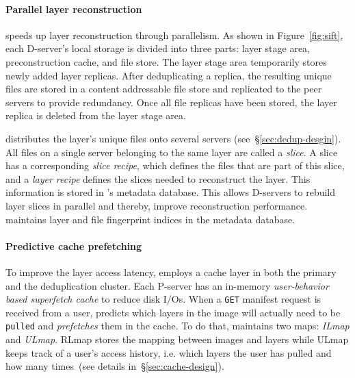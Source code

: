 \paragraph{Parallel layer reconstruction}
%
\sysname speeds up layer reconstruction through parallelism.
%
As shown in Figure~\ref{fig:sift}, each D-server's local storage is divided
into three parts: layer stage area, preconstruction cache, and file store.
%
The layer stage area temporarily stores newly added layer replicas.
%
After deduplicating a replica, the resulting unique files are stored in a
content addressable file store and replicated to the peer servers to provide
redundancy. Once all file replicas have been stored, the layer replica is deleted
from the layer stage area.%
%

\sysname distributes the layer's unique files onto several servers
(see~\S\ref{sec:dedup-desgin}).
%
All files on a single server belonging to the same layer are called a
\emph{slice}.
%
A slice has a corresponding \emph{slice recipe}, which defines the files that
are part of this slice, and a \emph{layer recipe} defines the slices needed to
reconstruct the layer.
%
This information is stored in \sysname{}'s metadata database.
%
This allows D-servers to rebuild layer slices in parallel and thereby, improve
reconstruction performance.
%
\sysname maintains layer and file fingerprint indices in the
metadata database.




\paragraph{Predictive cache prefetching}
%
To improve the layer access latency, \sysname employs a cache layer in both the
primary and the deduplication cluster.
%
Each P-server has an in-memory \emph{user-behavior based superfetch cache} to
reduce disk I/Os.
%
When a \texttt{GET} manifest request is received from a user, \sysname
predicts which layers in the image will actually need to be \texttt{pulled} and
\emph{prefetches} them in the cache.
%
To do that, \sysname maintains two maps: \emph{ILmap} and \emph{ULmap}.
%
RLmap stores the mapping between images and layers while ULmap keeps track of a
user's access history, i.e. which layers the user has pulled and how many
times~(see details in~\S\ref{sec:cache-design}).

